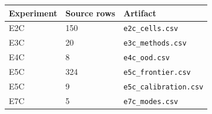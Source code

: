 \begin{tabular}{lll}
\toprule
Experiment & Source rows & Artifact \\
\midrule
E2C & 150 & \texttt{e2c_cells.csv} \\
E3C & 20 & \texttt{e3c_methods.csv} \\
E4C & 8 & \texttt{e4c_ood.csv} \\
E5C & 324 & \texttt{e5c_frontier.csv} \\
E5C & 9 & \texttt{e5c_calibration.csv} \\
E7C & 5 & \texttt{e7c_modes.csv} \\
\bottomrule
\end{tabular}
